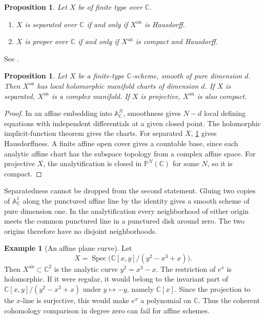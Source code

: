 \documentclass[11pt,reqno]{amsart}
\newtheorem{proposition}[theorem]{Proposition}
\theoremstyle{definition}
\newtheorem{example}[theorem]{Example}
\theoremstyle{remark}
\newcommand{\C}{\mathbb{C}}
\newcommand{\PP}{\mathbb{P}}
\newcommand{\AAA}{\mathbb{A}}
\newcommand{\Xan}{X^{\mathrm{an}}}
\DeclareMathOperator{\Spec}{Spec}
\begin{document}
\begin{proposition}
\label{prop:sep-proper}
Let $X$ be of finite type over $\C$.
\begin{enumerate}
  \item $X$ is separated over $\C$ if and only if $\Xan$ is Hausdorff.
  \item $X$ is proper over $\C$ if and only if $\Xan$ is compact and
  Hausdorff.
\end{enumerate}
\end{proposition}

See \cite[Exp.~XII, Prop.~3.1(viii) and Prop.~3.2(v)]{sga1}.

\begin{proposition}
\label{prop:smooth-manifold}
Let $X$ be a finite-type $\C$-scheme, smooth of pure dimension $d$. Then
$\Xan$ has local holomorphic manifold charts of dimension $d$. If $X$ is
separated, $\Xan$ is a complex manifold. If $X$ is projective, $\Xan$ is
also compact.
\end{proposition}

\begin{proof}
In an affine embedding into $\AAA^N_{\C}$, smoothness gives $N-d$
local defining equations with independent differentials at a given closed
point. The holomorphic implicit-function theorem gives the charts. For
separated $X$, \cref{prop:sep-proper} gives Hausdorffness. A finite affine
open cover gives a countable base, since each analytic affine chart has
the subspace topology from a complex affine space. For projective $X$,
the analytification is closed in $\PP^N(\C)$ for some $N$, so it is compact.
\end{proof}

Separatedness cannot be dropped from the second statement. Gluing two copies
of $\AAA^1_{\C}$ along the punctured affine line by the identity gives a
smooth scheme of pure dimension one. In the analytification
every neighborhood of either origin meets the common punctured line in
a punctured disk around zero. The two origins therefore have no disjoint
neighborhoods.

\begin{example}[An affine plane curve]
\label{ex:curve}
Let
\[
X=\Spec\bigl(\C[x,y]/(y^2-x^3+x)\bigr).
\]
Then $\Xan\subset\C^2$ is the analytic curve $y^2=x^3-x$. The restriction of
$e^x$ is holomorphic. If it were regular, it would belong to the invariant
part of $\C[x,y]/(y^2-x^3+x)$ under $y\mapsto-y$, namely $\C[x]$. Since the
projection to the $x$-line is surjective, this would make $e^x$ a polynomial
on $\C$. Thus the coherent cohomology comparison in degree zero can fail
for affine schemes.
\end{example}
\end{document}
